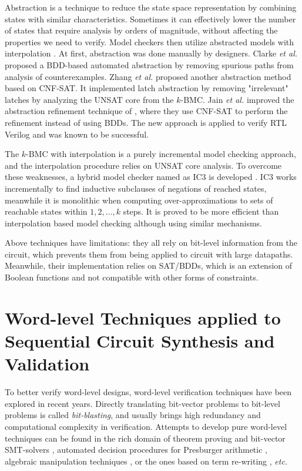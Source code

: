 Abstraction is a technique to reduce the state space representation by combining states with similar 
characteristics. Sometimes it can effectively lower the number of states that require analysis by orders of magnitude,
without affecting the properties we need to verify. Model checkers then utilize abstracted models 
with interpolation \cite{mcmillan2003interpolation,mcmillan:cav06}.
At first, abstraction was done manually by designers. Clarke {\it et al.} \cite{clarke2000counterexample}
proposed a BDD-based automated abstraction by removing spurious paths from analysis of counterexamples. 
Zhang {\it et al.} \cite{zhang2005design} proposed another abstraction method based on CNF-SAT.
It implemented latch abstraction by removing "irrelevant" latches by analyzing the 
UNSAT core from the $k$-BMC. Jain {\it et al.} \cite{jain2005word} improved the abstraction refinement technique of \cite{clarke2000counterexample},
where they use CNF-SAT to perform the refinement instead of using BDDs. The new approach is applied to verify RTL Verilog
and was known to be successful.

The $k$-BMC with interpolation is a purely incremental model checking approach, and the interpolation procedure relies
on UNSAT core analysis. To overcome these weaknesses, a hybrid model checker named as IC3 is developed 
\cite{bradley2011sat,bradley2011incremental}. IC3 works incrementally to find inductive subclauses
of negations of reached states, meanwhile it is monolithic when computing over-approximations to sets of reachable
states within $1,2,\dots,k$ steps. It is proved to be more efficient than interpolation based model checking
although using similar mechanisms.

Above techniques have limitations: they all rely on bit-level information from 
the circuit, which prevents them from being applied to circuit with large datapaths.
Meanwhile, their implementation relies on SAT/BDDs, which is an extension of Boolean 
functions and not compatible with other forms of constraints.

\section{Word-level Techniques applied to Sequential Circuit Synthesis and Validation}
To better verify word-level designs, word-level verification techniques have been 
explored in recent years. Directly translating bit-vector problems to bit-level 
problems is called {\it bit-blasting}, and usually brings high redundancy and computational complexity in verification.
Attempts to develop pure word-level techniques can be found in
the rich domain of 
theorem proving \cite{arditi:bmd} and bit-vector SMT-solvers
\cite{boolector,cvc3,z3,bitvector98}, automated
decision procedures for Presburger arithmetic \cite{presburger,bultan:mixed_verification}, 
algebraic manipulation techniques 
\cite{devadas:algebraic_manipulation_iccd91}, or the ones based on
term re-writing \cite{AST}, {\it etc.}

